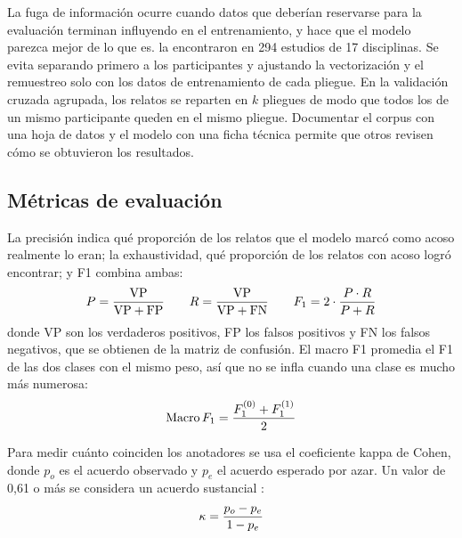 La fuga de información ocurre cuando datos que deberían reservarse para la evaluación terminan influyendo en el entrenamiento, y hace que el modelo parezca mejor de lo que es. \citet{kapoor2023} la encontraron en 294 estudios de 17 disciplinas. Se evita separando primero a los participantes y ajustando la vectorización y el remuestreo solo con los datos de entrenamiento de cada pliegue. En la validación cruzada agrupada, los relatos se reparten en $k$ pliegues de modo que todos los de un mismo participante queden en el mismo pliegue. Documentar el corpus con una hoja de datos \citep{gebru2021} y el modelo con una ficha técnica \citep{mitchell2019} permite que otros revisen cómo se obtuvieron los resultados.

\subsection{Métricas de evaluación}
La precisión indica qué proporción de los relatos que el modelo marcó como acoso realmente lo eran; la exhaustividad, qué proporción de los relatos con acoso logró encontrar; y F1 combina ambas:
\begin{equation}
\ecuacion{Precisión, exhaustividad y F1}
P = \frac{\mathrm{VP}}{\mathrm{VP} + \mathrm{FP}} \qquad
R = \frac{\mathrm{VP}}{\mathrm{VP} + \mathrm{FN}} \qquad
F_1 = 2 \cdot \frac{P \cdot R}{P + R}
\label{eq:metricas}
\end{equation}
donde VP son los verdaderos positivos, FP los falsos positivos y FN los falsos negativos, que se obtienen de la matriz de confusión. El macro F1 promedia el F1 de las dos clases con el mismo peso, así que no se infla cuando una clase es mucho más numerosa:
\begin{equation}
\ecuacion{Macro F1 para dos clases}
\mathrm{Macro}\,F_1 = \frac{F_1^{(0)} + F_1^{(1)}}{2}
\label{eq:macrof1}
\end{equation}

Para medir cuánto coinciden los anotadores se usa el coeficiente kappa de Cohen, donde $p_o$ es el acuerdo observado y $p_e$ el acuerdo esperado por azar. Un valor de 0,61 o más se considera un acuerdo sustancial \citep{landis1977}:
\begin{equation}
\ecuacion{Coeficiente kappa de Cohen}
\kappa = \frac{p_o - p_e}{1 - p_e}
\label{eq:kappa}
\end{equation}

